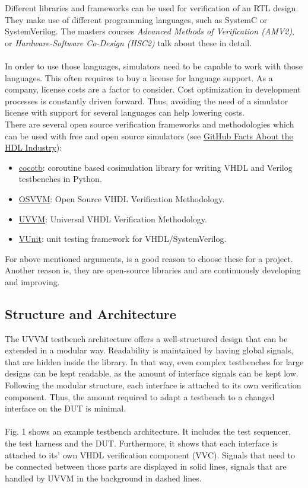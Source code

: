 Different libraries and frameworks can be used for verification of an RTL design. They make use of different programming languages, such as SystemC or SystemVerilog. The masters courses \textit{Advanced Methods of Verification (AMV2)}, or \textit{Hardware-Software Co-Design (HSC2)} talk about these in detail.\\
\\
In order to use those languages, simulators need to be capable to work with those languages. This often requires to buy a license for language support. As a company, license costs are a factor to consider. Cost optimization in development processes is constantly driven forward. Thus, avoiding the need of a simulator license with support for several languages can help lowering costs.\\
There are several open source verification frameworks and methodologies which can be used with free and open source simulators (see \href{https://larsasplund.github.io/github-facts/}{GitHub Facts About the HDL Industry}):
\begin{itemize}
\item \href{https://github.com/cocotb/cocotb}{cocotb}: coroutine based cosimulation library for writing VHDL and Verilog testbenches in Python.
\item \href{https://github.com/OSVVM/OSVVM}{OSVVM}: Open Source VHDL Verification Methodology.
\item \href{https://github.com/UVVM/UVVM}{UVVM}: Universal VHDL Verification Methodology.
\item \href{https://github.com/VUnit/vunit}{VUnit}: unit testing framework for VHDL/SystemVerilog.
\end{itemize}
For above mentioned arguments, is a good reason to choose these for a project. Another reason is, they are open-source libraries and are continuously developing and improving.

\subsection{Structure and Architecture}

The UVVM testbench architecture offers a well-structured design that can be extended in a modular way. Readability is maintained by having global signals, that are hidden inside the library. In that way, even complex testbenches for large designs can be kept readable, as the amount of interface signals can be kept low. Following the modular structure, each interface is attached to its own verification component. Thus, the amount required to adapt a testbench to a changed interface on the DUT is minimal. \\
\\
Fig. 1 shows an example testbench architecture. It includes the test sequencer, the test harness and the DUT. Furthermore, it shows that each interface is attached to its' own VHDL verification component (VVC). Signals that need to be connected between those parts are displayed in solid lines, signals that are handled by UVVM in the background in dashed lines.

